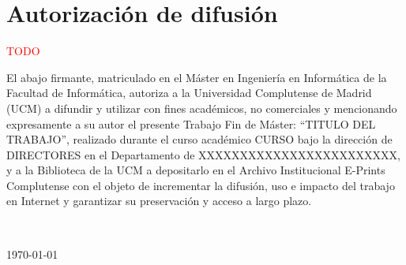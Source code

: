\chapter*{Autorización de difusión}

\textcolor{red}{TODO}

El abajo firmante, matriculado en el Máster en Ingeniería en Informática de la Facultad de Informática, autoriza a la Universidad Complutense de Madrid (UCM) a difundir y utilizar con fines académicos, no comerciales y mencionando expresamente a su autor el presente Trabajo Fin de Máster: ``TITULO DEL TRABAJO'', realizado durante el curso académico CURSO bajo la dirección de DIRECTORES en el Departamento de XXXXXXXXXXXXXXXXXXXXXXXX, y a la Biblioteca de la UCM a depositarlo en el Archivo Institucional E-Prints Complutense con el objeto de incrementar la difusión, uso e impacto del trabajo en Internet y garantizar su preservación y acceso a largo plazo.

\vspace{5cm}

\begin{center}
	\large \autor\\
	
	\vspace{0.5cm}
	
	\today\\
\end{center}
